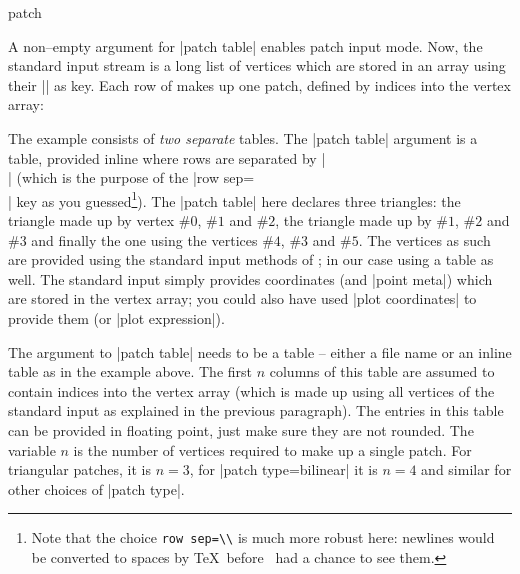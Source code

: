 {\begin{plottype}[/pgfplots]{patch}
\begin{pgfplotskeylist}
	A non--empty argument for |patch table| enables patch input mode. Now, the standard input stream is a long list of vertices which are stored in an array using their |\coordindex| as key. Each row of  makes up one patch, defined by indices into the vertex array:
\begin{codeexample}[]
\end{codeexample}
	\noindent The example consists of \emph{two separate} tables. The |patch table| argument is a table, provided inline where rows are separated by |\\| (which is the purpose of the |row sep=\\| key as you guessed\footnote{Note that the choice \texttt{row sep=\textbackslash\textbackslash} is much more robust here: newlines would be converted to spaces by \TeX\ before \PGFPlots\ had a chance to see them.}). The |patch table| here declares three triangles: the triangle made up by vertex $\#0$, $\#1$ and $\#2$, the triangle made up by $\#1$, $\#2$ and $\#3$ and finally the one using the vertices $\#4$, $\#3$ and $\#5$. The vertices as such are provided using the standard input methods of \PGFPlots; in our case using a table as well. The standard input simply provides coordinates (and |point meta|) which are stored in the vertex array; you could also have used |plot coordinates| to provide them (or |plot expression|).
	
	The argument to |patch table| needs to be a table -- either a file name or an inline table as in the example above. The first $n$ columns of this table are assumed to contain indices into the vertex array (which is made up using all vertices of the standard input as explained in the previous paragraph). The entries in this table can be provided in floating point, just make sure they are not rounded. The variable $n$ is the number of vertices required to make up a single patch. For triangular patches, it is $n=3$, for |patch type=bilinear| it is $n=4$ and similar for other choices of |patch type|.


\end{pgfplotskeylist}
\end{plottype}}
